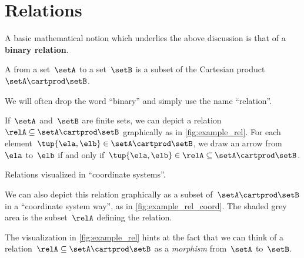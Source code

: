 

\section{Relations}
\label{sec:connection-relations}

A basic mathematical notion which underlies the above discussion is that of a \textbf{binary relation}.

\begin{definition}
  \label{def:binary-relation}
  A \emph{} from a set~$\setA$ to a set~$\setB$ is a subset of the Cartesian product $\setA\cartprod \setB$.
\end{definition}

\begin{remark}
  We will often drop the word ``binary'' and simply use the name ``relation''.
\end{remark}

\begin{marginfigure}
  \centering
  \caption{}
  \label{fig:example_rel}
\end{marginfigure}

If~$\setA$ and~$\setB$ are finite sets, we can depict a relation~$\relA \subseteq \setA \cartprod \setB$ graphically as in \cref{fig:example_rel}. For each element~$\tup{\ela,\elb} \in \setA \cartprod \setB$, we draw an arrow from~$\ela$ to~$\elb$ if and only if~$\tup{\ela,\elb} \in \relA \subseteq \setA \cartprod \setB$.


\begin{marginfigure}
  \begin{center}
  \end{center}
  \caption{Relations visualized in ``coordinate systems''.}
  \label{fig:example_rel_coord}
\end{marginfigure}

We can also depict this relation graphically as a subset of~$\setA \cartprod \setB$ in a ``coordinate system way'', as in \cref{fig:example_rel_coord}. The shaded grey area is the subset~$\relA$ defining the relation.



The visualization in \cref{fig:example_rel} hints at the fact that we can think of a relation~$\relA \subseteq \setA \cartprod \setB$ as a \emph{morphism} from~$\setA$ to~$\setB$.

